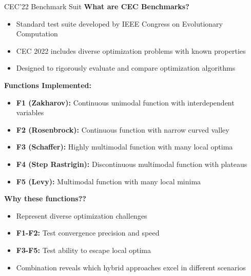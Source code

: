 \documentclass[aspectratio=169]{beamer}
\begin{document}
\begin{frame}{CEC'22 Benchmark Suit}
    \textbf{What are CEC Benchmarks?} \\
    \begin{itemize}
        \item Standard test suite developed by IEEE Congress on Evolutionary Computation
        \item CEC 2022 includes diverse optimization problems with known properties
        \item Designed to rigorously evaluate and compare optimization algorithms\\
    \end{itemize}

    \textbf{Functions Implemented:} \\
    \begin{itemize}
        \item \textbf{F1 (Zakharov):} Continuous unimodal function with interdependent variables
        \item \textbf{F2 (Rosenbrock):} Continuous function with narrow curved valley
        \item \textbf{F3 (Schaffer):} Highly multimodal function with many local optima
        \item \textbf{F4 (Step Rastrigin):} Discontinuous multimodal function with plateaus
        \item \textbf{F5 (Levy):} Multimodal function with many local minima
    \end{itemize}
\end{frame}
\begin{frame}
    \textbf{Why these functions??}
    \begin{itemize}
        \item Represent diverse optimization challenges
        \item \textbf{F1-F2:} Test convergence precision and speed
        \item \textbf{F3-F5:} Test ability to escape local optima
        \item Combination reveals which hybrid approaches excel in different scenarios
    \end{itemize}
\end{frame}
\end{document}
